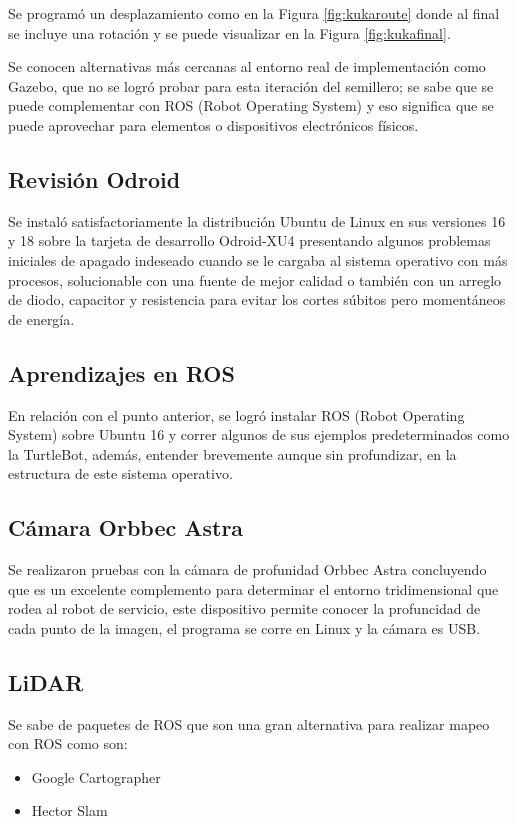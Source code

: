 \documentclass[conference]{IEEEtran}
\begin{document}
Se programó un desplazamiento como en la Figura \ref{fig:kukaroute} donde al final
se incluye una rotación y se puede visualizar en la Figura \ref{fig:kukafinal}.


Se conocen alternativas más cercanas al entorno real de implementación como
Gazebo, que no se logró probar para esta iteración del semillero; se sabe que se puede
complementar con ROS (Robot Operating System) y eso significa que se puede aprovechar
para elementos o dispositivos electrónicos físicos.

\subsection{Revisión Odroid}
Se instaló satisfactoriamente la distribución Ubuntu de Linux en sus versiones 16 y 18
sobre la tarjeta de desarrollo Odroid-XU4 presentando algunos problemas iniciales de
apagado indeseado cuando se le cargaba al sistema operativo con más procesos,
solucionable con una fuente de mejor calidad o también con un arreglo de diodo, capacitor
y resistencia para evitar los cortes súbitos pero momentáneos de energía.

\subsection{Aprendizajes en ROS}
En relación con el punto anterior, se logró instalar ROS (Robot Operating System)
sobre Ubuntu 16 y correr algunos de sus ejemplos predeterminados como la TurtleBot,
además, entender brevemente aunque sin profundizar, en la estructura de este sistema operativo.

\subsection{Cámara Orbbec Astra}
Se realizaron pruebas con la cámara de profunidad Orbbec Astra concluyendo que
es un excelente complemento para determinar el entorno tridimensional que rodea
al robot de servicio, este dispositivo permite conocer la profuncidad de cada punto
de la imagen, el programa se corre en Linux y la cámara es USB.

\subsection{LiDAR}
Se sabe de paquetes de ROS que son una gran alternativa para realizar mapeo con ROS como son:
\begin{itemize}
  \item Google Cartographer
  \item Hector Slam
\end{itemize}
\end{document}
